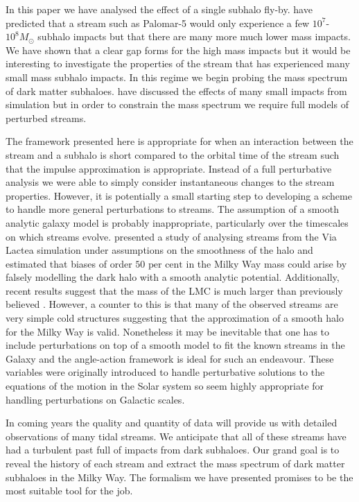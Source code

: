 \documentclass[useAMS,usenatbib,fleqn,a4paper]{mn2e}
\def\percent{\text{ per cent}}
\def\percent{\text{ per cent}}
\begin{document}
In this paper we have analysed the effect of a single subhalo fly-by. \cite{YoonJohnstonHogg} have predicted that a stream such as Palomar-5 would only experience a few $10^7$-$10^8M_\odot$ subhalo impacts but that there are many more much lower mass impacts. We have shown that a clear gap forms for the high mass impacts but it would be interesting to investigate the properties of the stream that has experienced many small mass subhalo impacts. In this regime we begin probing the mass spectrum of dark matter subhaloes. \cite{Carlberg2013} \cite{NganCarlberg2014} have discussed the effects of many small impacts from simulation but in order to constrain the mass spectrum we require full models of perturbed streams.

The framework presented here is appropriate for when an interaction between the stream and a subhalo is short compared to the orbital time of the stream such that the impulse approximation is appropriate. Instead of a full perturbative analysis we were able to simply consider instantaneous changes to the stream properties. However, it is potentially a small starting step to developing a scheme to handle more general perturbations to streams. The assumption of a smooth analytic galaxy model is probably inappropriate, particularly over the timescales on which streams evolve. \cite{Bonaca2014} presented a study of analysing streams from the Via Lactea simulation under assumptions on the smoothness of the halo and estimated that biases of order $50\percent$ in the Milky Way mass could arise by falsely modelling the dark halo with a smooth analytic potential. Additionally, recent results suggest that the mass of the LMC is much larger than previously believed \citep{Kallivayalil2013, Penarrubia2015}. However, a counter to this is that many of the observed streams are very simple cold structures suggesting that the approximation of a smooth halo for the Milky Way is valid. Nonetheless it may be inevitable that one has to include perturbations on top of a smooth model to fit the known streams in the Galaxy and the angle-action framework is ideal for such an endeavour. These variables were originally introduced to handle perturbative solutions to the equations of the motion in the Solar system so seem highly appropriate for handling perturbations on Galactic scales.

In coming years the quality and quantity of data will provide us with detailed observations of many tidal streams. We anticipate that all of these streams have had a turbulent past full of impacts from dark subhaloes. Our grand goal is to reveal the history of each stream and extract the mass spectrum of dark matter subhaloes in the Milky Way. The formalism we have presented promises to be the most suitable tool for the job.
\end{document}
